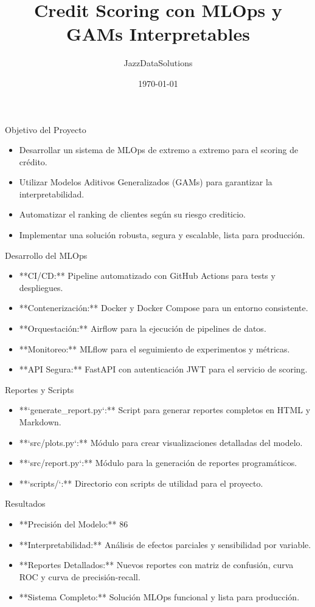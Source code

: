 \documentclass{beamer}
\title{Credit Scoring con MLOps y GAMs Interpretables}
\author{JazzDataSolutions}
\institute{Finvero}
\date{\today}
\begin{document}
\begin{frame}
  \titlepage
\end{frame}

\begin{frame}{Objetivo del Proyecto}
  \begin{itemize}
    \item Desarrollar un sistema de MLOps de extremo a extremo para el scoring de crédito.
    \item Utilizar Modelos Aditivos Generalizados (GAMs) para garantizar la interpretabilidad.
    \item Automatizar el ranking de clientes según su riesgo crediticio.
    \item Implementar una solución robusta, segura y escalable, lista para producción.
  \end{itemize}
\end{frame}

\begin{frame}{Desarrollo del MLOps}
  \begin{itemize}
    \item **CI/CD:** Pipeline automatizado con GitHub Actions para tests y despliegues.
    \item **Contenerización:** Docker y Docker Compose para un entorno consistente.
    \item **Orquestación:** Airflow para la ejecución de pipelines de datos.
    \item **Monitoreo:** MLflow para el seguimiento de experimentos y métricas.
    \item **API Segura:** FastAPI con autenticación JWT para el servicio de scoring.
  \end{itemize}
\end{frame}

\begin{frame}{Reportes y Scripts}
  \begin{itemize}
    \item **`generate_report.py`:** Script para generar reportes completos en HTML y Markdown.
    \item **`src/plots.py`:** Módulo para crear visualizaciones detalladas del modelo.
    \item **`src/report.py`:** Módulo para la generación de reportes programáticos.
    \item **`scripts/`:** Directorio con scripts de utilidad para el proyecto.
  \end{itemize}
\end{frame}

\begin{frame}{Resultados}
  \begin{itemize}
    \item **Precisión del Modelo:** 86%
    \item **Interpretabilidad:** Análisis de efectos parciales y sensibilidad por variable.
    \item **Reportes Detallados:** Nuevos reportes con matriz de confusión, curva ROC y curva de precisión-recall.
    \item **Sistema Completo:** Solución MLOps funcional y lista para producción.
  \end{itemize}
\end{frame}
\end{document}

